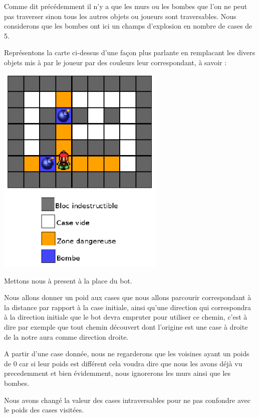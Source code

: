 			Comme dit précédemment il n'y a que les murs ou les bombes que l'on ne peut
			pas traverser sinon tous les autres objets ou joueurs sont traversables.
			Nous considerons que les bombes ont ici un champs d'explosion en nombre de
			cases de 5.			
			
			Représentons la carte ci-dessus d'une façon plus parlante en remplacant les
			divers objets mis à par le joueur par des couleurs leur correspondant, à
			savoir :
			
			\begin{center}
				\includegraphics[width=8cm]{./Analyse/Img/largeur_1.eps}
			\end{center}
			
			Mettons nous à present à la place du \gls{bot}.
			
			Nous allons donner un poid aux cases que nous allons parcourir
			correspondant à la distance par rapport à la case initiale, ainsi qu'une
			direction qui correspondra à la direction initiale que le \gls{bot} devra empruter
			pour utiliser ce chemin, c'est à dire par exemple que tout chemin découvert
			dont l'origine est une case à droite de la notre aura comme direction droite.
			
			A partir d'une case donnée, nous ne regarderons que les voisines ayant un poids de 0
			car si leur poids est différent cela voudra dire que nous les avons déjà vu precedemment et bien évidemment,
			nous ignorerons les murs ainsi que les bombes.
			
			Nous avons changé la valeur des cases intraversables pour ne pas confondre avec le poids des cases visitées.			
			
